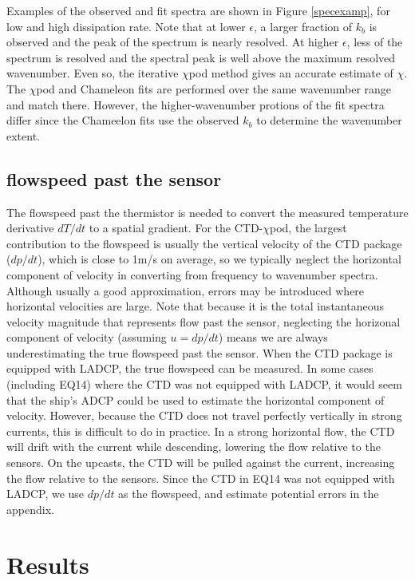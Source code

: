 \documentclass{ametsoc}
\begin{document}
Examples of the observed and fit spectra are shown in Figure \ref{specexamp}, for low and high dissipation rate. Note that at lower $\epsilon$, a larger fraction of $k_b$ is observed and the peak of the spectrum is nearly resolved. At higher $\epsilon$, less of the spectrum is resolved and the spectral peak is well above the maximum resolved wavenumber. Even so, the iterative $\chi$pod method gives an accurate estimate of $\chi$. The $\chi$pod and Chameleon fits are performed over the same wavenumber range and match there. However, the higher-wavenumber protions of the fit spectra differ since the Chameelon fits use the observed $k_b$ to determine the wavenumber extent.


\subsection{flowspeed past the sensor}

The flowspeed past the thermistor is needed to convert the measured temperature derivative $dT/dt$ to a spatial gradient. For the CTD-$\chi$pod, the largest contribution to the flowspeed is usually the vertical velocity of the CTD package ($dp/dt$), which is close to 1m/s on average, so we typically neglect the horizontal component of velocity in converting from frequency to wavenumber spectra. Although usually a good approximation, errors may be introduced where horizontal velocities are large. Note that because it is the total instantaneous velocity magnitude that represents flow past the sensor, neglecting the horizonal component of velocity (assuming $u=dp/dt$) means we are always underestimating the true flowspeed past the sensor. When the CTD package is equipped with LADCP, the true flowspeed can be measured. In some cases (including EQ14) where the CTD was not equipped with LADCP, it would seem that the ship's ADCP could be used to estimate the horizontal component of velocity. However, because the CTD does not travel perfectly vertically in strong currents, this is difficult to do in practice. In a strong horizontal flow, the CTD will drift with the current while descending, lowering the flow relative to the sensors. On the upcasts, the CTD will be pulled against the current, increasing the flow relative to the sensors. Since the CTD in EQ14 was not equipped with LADCP, we use $dp/dt$ as the flowspeed, and estimate potential errors in the appendix.



\section{Results }
\end{document}
